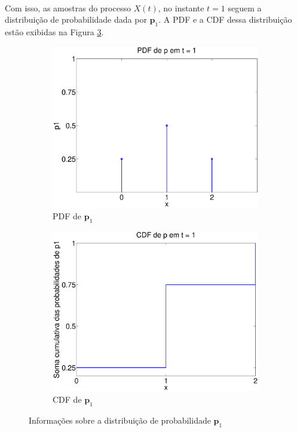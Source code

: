 \documentclass{report}
\begin{document}
\paragraph{} Com isso, as amostras do processo $X(t)$, no instante $t = 1$ seguem a distribuição de probabilidade dada por $\mathbf{p}_1$. A PDF e a CDF dessa distribuição estão exibidas na Figura \ref{pdf_cdf_p1}.\\

\begin{figure}[H]
	\centering
	\begin{subfigure}{0.4\textwidth}
		\centering
		\includegraphics[width = \textwidth]{Q1_b_pdf_p1}
		\caption{PDF de $\mathbf{p}_1$}
		\label{pdf_p1}
	\end{subfigure}
	\begin{subfigure}{0.4\textwidth}
		\centering
		\includegraphics[width = \textwidth]{Q1_b_cdf_p1}
		\caption{CDF de $\mathbf{p}_1$}
		\label{cdf_p1}
	\end{subfigure}
	\caption{Informações sobre a distribuição de probabilidade $\mathbf{p}_1$}
	\label{pdf_cdf_p1}
\end{figure}
\end{document}
